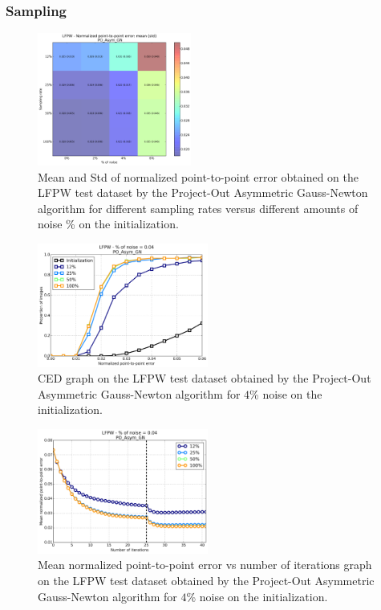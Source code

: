 \subsubsection{Sampling}

\begin{figure}[h!]
    \centering
    \includegraphics[width=0.45\textwidth]{experiments/sampling/po_asymmetric_gn/noise_vs_sampling_po_asymmetric.png}
    \caption{Mean and Std of normalized point-to-point error obtained on the LFPW test dataset by the Project-Out Asymmetric Gauss-Newton algorithm for different sampling rates versus different amounts of noise \% on the initialization.}
    \label{fig:noise_vs_sampling_po_asymmetric}
\end{figure}

\begin{figure}[h!]
    \centering
    \includegraphics[width=0.50\textwidth]{experiments/sampling/po_asymmetric_gn/ced_po_asymmetric_gn_4.png}
    \caption{CED graph on the LFPW test dataset obtained by the Project-Out Asymmetric Gauss-Newton algorithm for $4$\% noise on the initialization.}
    \label{fig:ced_po_asymmetric_gn_4}
\end{figure}

\begin{figure}[h!]
    \centering
    \includegraphics[width=0.50\textwidth]{experiments/sampling/po_asymmetric_gn/mean_error_vs_iters_po_asymmetric_gn_4.png}
    \caption{Mean normalized point-to-point error vs number of iterations graph on the LFPW test dataset obtained by the Project-Out Asymmetric Gauss-Newton algorithm for $4$\% noise on the initialization.}
    \label{fig:mean_error_vs_iters_po_asymmetric_gn_4}
\end{figure}


